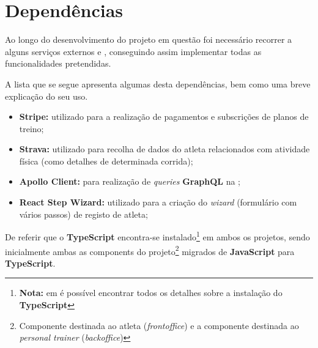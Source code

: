 \section{Dependências}

Ao longo do desenvolvimento do projeto em questão foi necessário recorrer a alguns serviços externos e , conseguindo assim implementar todas as funcionalidades pretendidas.

A lista que se segue apresenta algumas desta dependências, bem como uma breve explicação do seu uso.

\begin{itemize}
	\item \textbf{Stripe:} utilizado para a realização de pagamentos e subscrições de planos de treino;
	\item \textbf{Strava:} utilizado para recolha de dados do atleta relacionados com atividade física (como detalhes de determinada corrida);
	\item \textbf{Apollo Client:} para realização de \textit{queries} \textbf{GraphQL} na ;
	\item \textbf{React Step Wizard:} utilizado para a criação do \textit{wizard} (formulário com vários passos) de registo de atleta;
\end{itemize}

De referir que o \textbf{TypeScript} encontra-se instalado\footnote{\textbf{Nota:} em  é possível encontrar todos os detalhes sobre a instalação do \textbf{TypeScript}} em ambos os projetos, sendo inicialmente ambas as components do projeto\footnote{Componente destinada ao atleta (\textit{frontoffice}) e a componente destinada ao \textit{personal trainer} (\textit{backoffice})} migrados de \textbf{JavaScript} para \textbf{TypeScript}.